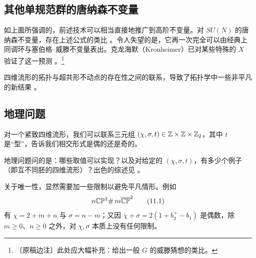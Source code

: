 
\subsection{其他单规范群的唐纳森不变量}

如上面所强调的，前述技术可以相当直接地推广到高阶不变量。对 $SU(N)$ 的唐纳森不变量，存在上述公式的类比 \cite{ref31}。令人失望的是，它再一次完全可以由经典上同调环与塞伯格--威滕不变量表出。克龙海默（Kronheimer）已对某些特殊的 $X$ 验证了这一预测 \cite{ref22}。\footnote{〔原稿边注〕此处应大幅补充：给出一般 $G$ 的威滕猜想的类比。}

四维流形的拓扑与超共形不动点的存在性之间的联系，导致了拓扑学中一些非平凡的新结果 \cite{ref33,ref34}。


\subsection{地理问题}

对一个紧致四维流形，我们可以联系三元组 $(\chi,\sigma,t)\in\mathbb{Z}\times\mathbb{Z}\times\mathbb{Z}_{2}$，其中 $t$ 是“型”，告诉我们相交形式是偶的还是奇的。

地理问题问的是：哪些取值可以实现？以及对给定的 $(\chi,\sigma,t)$，有多少个例子（即互不同胚的四维流形）？出色的综述见 \cite{ref50,ref12}。

关于唯一性，显然需要加一些限制以避免平凡情形。例如
\begin{equation}
  n\mathbb{C}\mathbb{P}^{2}\#\, m\overline{\mathbb{C}\mathbb{P}}^{2}
  \tag{11.1}
\end{equation}
有 $\chi=2+m+n$ 与 $\sigma=n-m$；又因 $\chi+\sigma=2(1+b_{2}^{+}-b_{1})$ 是偶数，除 $m\ge0$、$n\ge0$ 之外，对 $\chi,\sigma$ 本质上没有任何限制。

